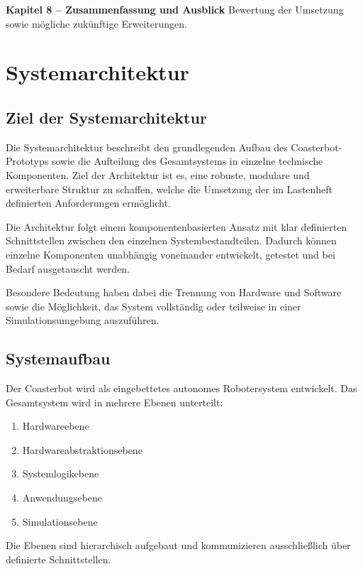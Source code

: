 \textbf{Kapitel 8 -- Zusammenfassung und Ausblick} Bewertung der
Umsetzung sowie mögliche zukünftige Erweiterungen.

\section{Systemarchitektur}\label{systemarchitektur}

\subsection{Ziel der
Systemarchitektur}\label{ziel-der-systemarchitektur}

Die Systemarchitektur beschreibt den grundlegenden Aufbau des
Coasterbot-Prototyps sowie die Aufteilung des Gesamtsystems in einzelne
technische Komponenten. Ziel der Architektur ist es, eine robuste,
modulare und erweiterbare Struktur zu schaffen, welche die Umsetzung der
im Lastenheft definierten Anforderungen ermöglicht.

Die Architektur folgt einem komponentenbasierten Ansatz mit klar
definierten Schnittstellen zwischen den einzelnen Systembestandteilen.
Dadurch können einzelne Komponenten unabhängig voneinander entwickelt,
getestet und bei Bedarf ausgetauscht werden.

Besondere Bedeutung haben dabei die Trennung von Hardware und Software
sowie die Möglichkeit, das System vollständig oder teilweise in einer
Simulationsumgebung auszuführen.

\subsection{Systemaufbau}\label{systemaufbau}

Der Coasterbot wird als eingebettetes autonomes Robotersystem
entwickelt. Das Gesamtsystem wird in mehrere Ebenen unterteilt:

\begin{enumerate}
\def\labelenumi{\arabic{enumi}.}
\tightlist
\item
  Hardwareebene
\item
  Hardwareabstraktionsebene
\item
  Systemlogikebene
\item
  Anwendungsebene
\item
  Simulationsebene
\end{enumerate}

Die Ebenen sind hierarchisch aufgebaut und kommunizieren ausschließlich
über definierte Schnittstellen.

